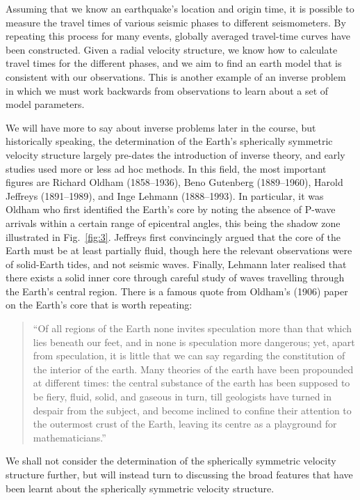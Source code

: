 Assuming that we know an earthquake's location and origin time, it is possible to measure the travel times of various seismic phases to different seismometers. By repeating 
this process for many events, globally averaged travel-time curves have been constructed. Given a radial velocity structure, we know how to calculate travel times for 
the different phases, and we aim to find an earth model that is consistent with our observations. This is another example of an inverse problem in which we must work 
backwards from observations to learn about a set of model parameters.

We will have more to say about inverse problems later in the course, but historically speaking, 
the determination of the Earth's spherically symmetric velocity structure largely pre-dates the introduction of inverse theory, and early studies used more or less ad 
hoc methods. In this field, the most important figures are Richard Oldham (1858--1936), Beno Gutenberg (1889--1960), Harold Jeffreys (1891--1989), and 
Inge Lehmann (1888--1993). In particular, it was Oldham who first identified the Earth's core by noting the absence of P-wave arrivals within a certain range of 
epicentral angles, this being the shadow zone illustrated in Fig.~\ref{fig:3}. Jeffreys first convincingly argued that the core of the Earth must be at least partially fluid, though here the relevant observations were 
of solid-Earth tides, and not seismic waves. Finally, Lehmann later realised that there exists a solid inner core through careful study of waves travelling 
through the Earth's central region. There is a famous quote from Oldham's (1906) paper on the Earth's core that is worth repeating:
\begin{quote}
``Of all regions of the Earth none invites speculation more than that which lies beneath our feet, and in none is speculation more dangerous; yet, apart from 
speculation, it is little that we can say regarding the constitution of the interior of the earth. Many theories of the earth have been propounded at different 
times: the central substance of the earth has been supposed to be fiery, fluid, solid, and gaseous in turn, till geologists have turned in despair from the 
subject, and become inclined to confine their attention to the outermost crust of the Earth, leaving its centre as a playground for mathematicians.''
\end{quote}
We shall not consider the determination of the spherically symmetric velocity structure further, but will instead turn to discussing the broad features that have been learnt about the spherically symmetric velocity structure.

